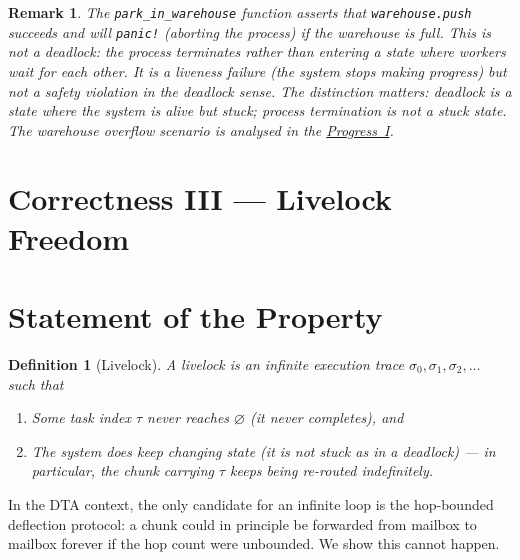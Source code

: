 \documentclass[11pt,a4paper]{article}
\newtheorem{definition}{Definition}[section]
\newtheorem{remark}{Remark}[section]
\newcommand{\code}[1]{\texttt{#1}}
\begin{document}
\begin{remark}
The \code{park\_in\_warehouse} function asserts that
\code{warehouse.push} succeeds and will \code{panic!} (aborting the
process) if the warehouse is full.  This is \emph{not} a deadlock:
the process terminates rather than entering a state where workers wait
for each other.  It is a \emph{liveness failure} (the system stops
making progress) but not a safety violation in the deadlock sense.
The distinction matters: deadlock is a state where the system is
\emph{alive but stuck}; process termination is not a stuck state.
The warehouse overflow scenario is analysed in the \hyperref[chap:bounded_wait]{Progress~I}.
\end{remark}


\section*{Correctness III --- Livelock Freedom}
\label{chap:livelock}


\setcounter{section}{0}


\section{Statement of the Property}

\begin{definition}[Livelock]
\label{def:livelock}
A \emph{livelock} is an infinite execution trace
$\sigma_0, \sigma_1, \sigma_2, \ldots$ such that
\begin{enumerate}
  \item Some task index $\tau$ never reaches $\varnothing$
        (it never completes), and
  \item The system \emph{does} keep changing state (it is not stuck
        as in a deadlock) --- in particular, the chunk carrying $\tau$
        keeps being re-routed indefinitely.
\end{enumerate}
\end{definition}

In the DTA context, the only candidate for an infinite loop is the
hop-bounded deflection protocol: a chunk could in principle be
forwarded from mailbox to mailbox forever if the hop count were
unbounded.  We show this cannot happen.
\end{document}

